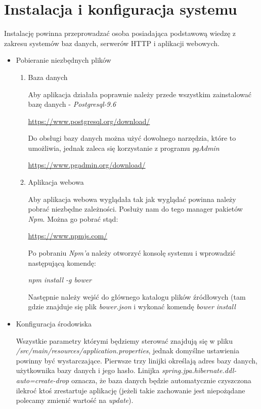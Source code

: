 \documentclass{report}
\begin{document}
\chapter{Instalacja i konfiguracja systemu}

Instalację powinna przeprowadzać osoba posiadająca podstawową wiedzę z zakresu systemów baz danych, serwerów HTTP i aplikacji webowych.

\begin{itemize}
	\item Pobieranie niezbędnych plików
	
	\begin{enumerate}
		
		\item Baza danych	
		
			Aby aplikacja działała poprawnie należy przede wszystkim zainstalować bazę danych - \textit{Postgresql-9.6}
			
			\url{https://www.postgresql.org/download/}
			
			Do obsługi bazy danych można użyć dowolnego narzędzia, które to umożliwia, jednak zaleca się korzystanie z programu \textit{pgAdmin}
			
			\url{https://www.pgadmin.org/download/}
			
		\item Aplikacja webowa
		
			Aby aplikacja webowa wyglądała tak jak wyglądać powinna należy pobrać niezbędne zależności. Posłuży nam do tego manager pakietów \textit{Npm}. Można go pobrać stąd:
			
			\url{https://www.npmjs.com/}
			
			Po pobraniu \textit{Npm'a} należy otworzyć konsolę systemu i wprowadzić następującą komendę:
			
			\textit{npm install -g bower}
			
			Następnie należy wejść do głównego katalogu plików źródłowych (tam gdzie znajduje się plik \textit{bower.json} i wykonać komendę \textit{bower install}
			
	\end{enumerate}

	\item Konfiguracja środowiska
	
		Wszystkie parametry którymi będziemy sterować znajdują się w pliku \textit{/src/main/resources/application.properties}, jednak domyślne ustawienia powinny być wystarczające. Pierwsze trzy linijki określają adres bazy danych, użytkownika bazy danych i jego hasło. Linijka \textit{spring.jpa.hibernate.ddl-auto=create-drop} oznacza, że baza danych będzie automatycznie czyszczona ilekroć ktoś zrestartuje aplikację (jeżeli takie zachowanie jest niepożądane polecamy zmienić wartość na \textit{update}).
		

\end{itemize}
\end{document}
